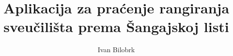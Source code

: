 \documentclass[times, utf8, zavrsni]{fer}
\begin{document}

\title{Aplikacija za praćenje rangiranja sveučilišta prema Šangajskoj listi}

\author{Ivan Bilobrk}

\maketitle





\zahvala{}

\tableofcontents
\end{document}
